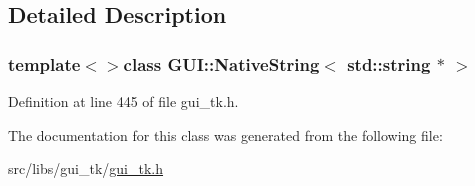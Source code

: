 \subsection{Detailed Description}
\subsubsection*{template$<$$>$class G\-U\-I\-::\-Native\-String$<$ std\-::string $\ast$ $>$}



Definition at line 445 of file gui\-\_\-tk.\-h.



The documentation for this class was generated from the following file\-:\begin{DoxyCompactItemize}
\item 
src/libs/gui\-\_\-tk/\hyperlink{gui__tk_8h}{gui\-\_\-tk.\-h}\end{DoxyCompactItemize}
